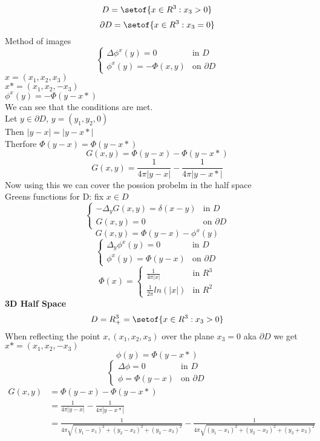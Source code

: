 \documentclass[answers,12pt,addpoints]{exam}
\begin{document}
$$D = \setof{x \in R^3: x_3 > 0}$$
$$\partial D = \setof{x \in R^3: x_3 = 0}$$
Method of images \\
$$\begin{cases}
    \Delta \phi^{x}(y) = 0 & \text{in } D\\
    \phi^{x}(y) = -\Phi(x,y) & \text{on } \partial D
\end{cases}$$
$x = (x_1, x_2, x_3)$\\
$x* = (x_1, x_2, -x_3)$\\
$\phi^{x}(y) = -\Phi(y-x*)$\\
We can see that the conditions are met.\\
Let $y \in \partial D$, $y = (y_1, y_2, 0)$\\
Then $|y - x| = |y - x*|$\\
Therfore $\Phi(y-x) = \Phi(y-x*)$\\
$$G(x,y) = \Phi(y-x) - \Phi(y-x*)$$
$$G(x,y) = \frac{1}{4\pi |y-x|} - \frac{1}{4\pi |y-x*|}$$
Now using this we can cover the possion probelm in the half space\\
Greens functions for D: fix $x \in D$\\
$$\begin{cases}
    -\Delta_y G(x,y) = \delta(x-y) & \text{in } D\\
    G(x,y) = 0 & \text{on } \partial D
\end{cases}$$
$$G(x,y) = \Phi(y-x) - \phi^{x}(y)$$
$$\begin{cases}
    \Delta_y \phi^{x}(y) = 0 & \text{in } D\\
    \phi^{x}(y) = \Phi(y-x) & \text{on } \partial D
\end{cases}$$
$$ \Phi(x) = \begin{cases}
    \frac{1}{4\pi |x|} & \text{in } R^3\\
    \frac{1}{2\pi} ln(|x|) & \text{in } R^2
\end{cases}$$
\textbf{3D Half Space}\\
$$D = R^3_+ = \setof{x \in R^3: x_3 > 0}$$
When reflecting the point $x, (x_1,x_2,x_3)$ over the plane $x_3 = 0$ aka $\partial D$ we get $x* = (x_1, x_2, -x_3)$\\
$$\phi(y) = \Phi(y-x*)$$
$$\begin{cases}
    \Delta \phi= 0 & \text{in } D\\
    \phi = \Phi(y-x) & \text{on } \partial D
\end{cases}$$
\begin{align*}
    G(x,y) &= \Phi(y-x) - \Phi(y-x*)\\
    &= \frac{1}{4\pi |y-x|} - \frac{1}{4\pi |y-x*|}\\
    &= \frac{1}{4\pi \sqrt{(y_1-x_1)^2 + (y_2-x_2)^2 + (y_3-x_3)^2}} - \frac{1}{4\pi \sqrt{(y_1-x_1)^2 + (y_2-x_2)^2 + (y_3+x_3)^2}}
\end{align*}
\end{document}
